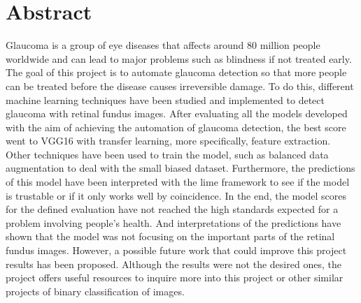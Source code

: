 \documentclass[11pt, a4paper]{article}
\begin{document}
\section*{Abstract}
Glaucoma is a group of eye diseases that affects around 80 million people worldwide and can lead to major problems such as blindness if not treated early. The goal of this project is to automate glaucoma detection so that more people can be treated before the disease causes irreversible damage. To do this, different machine learning techniques have been studied and implemented to detect glaucoma with retinal fundus images. After evaluating all the models developed with the aim of achieving the automation of glaucoma detection, the best score went to VGG16 with transfer learning, more specifically, feature extraction. Other techniques have been used to train the model, such as balanced data augmentation to deal with the small biased dataset. Furthermore, the predictions of this model have been interpreted with the lime framework to see if the model is trustable or if it only works well by coincidence. In the end, the model scores for the defined evaluation have not reached the high standards expected for a problem involving people's health. And interpretations of the predictions have shown that the model was not focusing on the important parts of the retinal fundus images. However, a possible future work that could improve this project results has been proposed. Although the results were not the desired ones, the project offers useful resources to inquire more into this project or other similar projects of binary classification of images.

\newpage
\end{document}
